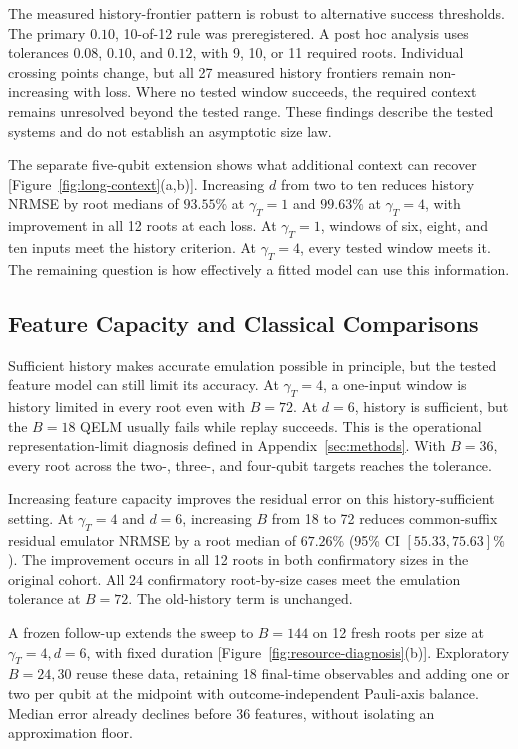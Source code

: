 The measured history-frontier pattern is robust to alternative success
thresholds. The primary $0.10$, 10-of-12 rule was preregistered.
A post hoc analysis uses tolerances $0.08$, $0.10$, and $0.12$, with 9, 10,
or 11 required roots. Individual crossing points change, but all 27 measured
history frontiers remain non-increasing with loss. Where no tested window
succeeds, the required context remains unresolved beyond the tested range.
These findings describe the tested systems and do not establish an
asymptotic size law.

The separate five-qubit extension shows what additional context can recover
[Figure~\ref{fig:long-context}(a,b)]. Increasing $d$ from two to ten reduces
history NRMSE by root medians of $93.55\%$ at $\gamma_T=1$ and $99.63\%$
at $\gamma_T=4$, with improvement in all 12 roots at each loss.
At $\gamma_T=1$, windows of six, eight, and ten inputs meet the history
criterion. At $\gamma_T=4$, every tested window meets it. The remaining
question is how effectively a fitted model can use this information.

\subsection{Feature Capacity and Classical Comparisons}

Sufficient history makes accurate emulation possible in principle, but
the tested feature model can still limit its accuracy. At $\gamma_T=4$,
a one-input window is history limited in every root even with $B=72$.
At $d=6$, history is sufficient, but the $B=18$ QELM usually fails while
replay succeeds. This is the operational representation-limit diagnosis
defined in Appendix~\ref{sec:methods}. With $B=36$, every root across the
two-, three-, and four-qubit targets reaches the tolerance.

Increasing feature capacity improves the residual error on this
history-sufficient setting. At $\gamma_T=4$ and $d=6$, increasing $B$ from
18 to 72 reduces common-suffix residual emulator NRMSE by a root median
of $67.26\%$ (95\% CI $[55.33,75.63]\%$).
The improvement occurs in all 12 roots in both confirmatory sizes
in the original cohort. All 24 confirmatory root-by-size
cases meet the emulation tolerance at $B=72$. The old-history term is unchanged.

A frozen follow-up extends the sweep to $B=144$ on 12 fresh roots per size
at $\gamma_T=4,d=6$, with fixed duration [Figure~\ref{fig:resource-diagnosis}(b)].
Exploratory $B=24,30$ reuse these data, retaining 18 final-time observables
and adding one or two per qubit at the midpoint with outcome-independent
Pauli-axis balance. Median error already declines before 36 features,
without isolating an approximation floor.

